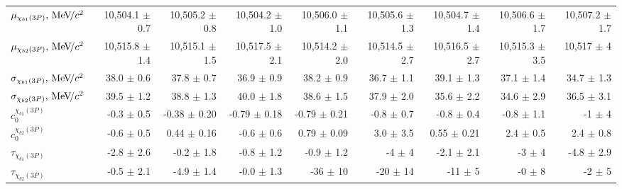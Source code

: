 \begin{table}[H]
{{\begin{tabular}{lrrrrrrrr}
\rule{0pt}{4ex}$\mu_{\chi_{b1}(3P)}, {\mathrm{\,Me\kern -0.1em V\!/}c^2}$ & 10,504.1 $\pm$ 0.7 & 10,505.2 $\pm$ 0.8 & 10,504.2 $\pm$ 1.0 & 10,506.0 $\pm$ 1.1 & 10,505.6 $\pm$ 1.3 & 10,504.7 $\pm$ 1.4 & 10,506.6 $\pm$ 1.7 & 10,507.2 $\pm$ 1.7\\
$\mu_{\chi_{b2}(3P)}, {\mathrm{\,Me\kern -0.1em V\!/}c^2}$ & 10,515.8 $\pm$ 1.4 & 10,515.1 $\pm$ 1.5 & 10,517.5 $\pm$ 2.1 & 10,514.2 $\pm$ 2.0 & 10,514.5 $\pm$ 2.7 & 10,516.5 $\pm$ 2.7 & 10,515.3 $\pm$ 3.5 & 10,517 $\pm$ 4\\

\rule{0pt}{4ex}$\sigma_{\chi_{b1}(3P)}, {\mathrm{\,Me\kern -0.1em V\!/}c^2}$ & 38.0 $\pm$ 0.6 & 37.8 $\pm$ 0.7 & 36.9 $\pm$ 0.9 & 38.2 $\pm$ 0.9 & 36.7 $\pm$ 1.1 & 39.1 $\pm$ 1.3 & 37.1 $\pm$ 1.4 & 34.7 $\pm$ 1.3\\
$\sigma_{\chi_{b2}(3P)}, {\mathrm{\,Me\kern -0.1em V\!/}c^2}$ & 39.5 $\pm$ 1.2 & 38.8 $\pm$ 1.3 & 40.0 $\pm$ 1.8 & 38.6 $\pm$ 1.5 & 37.9 $\pm$ 2.0 & 35.6 $\pm$ 2.2 & 34.6 $\pm$ 2.9 & 36.5 $\pm$ 3.1\\

\rule{0pt}{4ex}$c_0^{\chi_{b1}(3P)}$ & -0.3 $\pm$ 0.5 & -0.38 $\pm$ 0.20 & -0.79 $\pm$ 0.18 & -0.79 $\pm$ 0.21 & -0.8 $\pm$ 0.7 & -0.8 $\pm$ 0.4 & -0.8 $\pm$ 1.1 & -1 $\pm$ 4\\
$c_0^{\chi_{b2}(3P)}$ & -0.6 $\pm$ 0.5 & 0.44 $\pm$ 0.16 & -0.6 $\pm$ 0.6 & 0.79 $\pm$ 0.09 & 3.0 $\pm$ 3.5 & 0.55 $\pm$ 0.21 & 2.4 $\pm$ 0.5 & 2.4 $\pm$ 0.8\\

\rule{0pt}{4ex}$\tau_{\chi_{b1}(3P)}$ & -2.8 $\pm$ 2.6 & -0.2 $\pm$ 1.8 & -0.8 $\pm$ 1.2 & -0.9 $\pm$ 1.2 & -4 $\pm$ 4 & -2.1 $\pm$ 2.1 & -3 $\pm$ 4 & -4.8 $\pm$ 2.9\\
$\tau_{\chi_{b2}(3P)}$ & -0.5 $\pm$ 2.1 & -4.9 $\pm$ 1.4 & -0.0 $\pm$ 1.3 & -36 $\pm$ 10 & -20 $\pm$ 14 & -11 $\pm$ 5 & -0 $\pm$ 8 & -2 $\pm$ 5\\
\bottomrule
\end{tabular}
} %

} %
\end{table}
